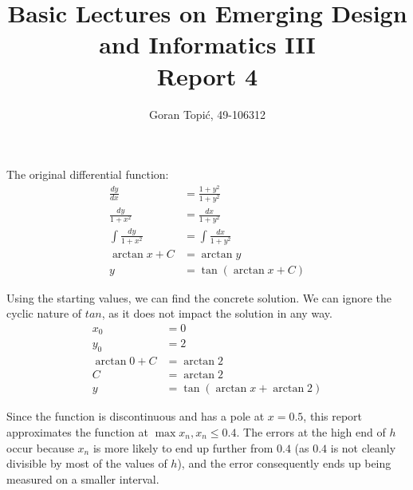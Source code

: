 \documentclass{article}
\begin{document}
\title{Basic Lectures on Emerging Design and Informatics III\\
Report 4}

\author{Goran Topi\'{c}, 49-106312}
\maketitle

The original differential function:
\begin{align}
  \frac{dy}{dx} &= \frac{1 + y^2}{1 + y^2} \\
  \frac{dy}{1 + x^2} &= \frac{dx}{1 + y^2} \\
  \int\frac{dy}{1 + x^2} &= \int\frac{dx}{1 + y^2} \\
  \arctan x + C &= \arctan y \\
  y &= \tan(\arctan x + C)
\end{align}

Using the starting values, we can find the concrete solution. We can
ignore the cyclic nature of $tan$, as it does not impact the solution in
any way.
\begin{align}
  x_0 &= 0 \\
  y_0 &= 2 \\
  \arctan 0 + C &= \arctan 2 \\
  C &= \arctan 2 \\
  y &= \tan(\arctan x + \arctan 2)
\end{align}

Since the function is discontinuous and has a pole at $x = 0.5$, this
report approximates the function at $\max x_n, x_n \leqslant 0.4$. The
errors at the high end of $h$ occur because $x_n$ is more likely to end
up further from $0.4$ (as $0.4$ is not cleanly divisible by most of the
values of $h$), and the error consequently ends up being measured on a
smaller interval.
\end{document}

